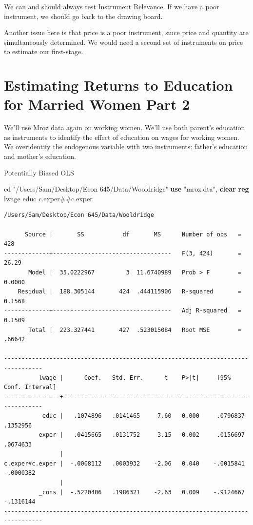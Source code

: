 \documentclass[
]{book}
\newenvironment{Shaded}{\begin{snugshade}}{\end{snugshade}}
\newcommand{\KeywordTok}[1]{\textcolor[rgb]{0.13,0.29,0.53}{\textbf{#1}}}
\newcommand{\NormalTok}[1]{#1}
\newcommand{\StringTok}[1]{\textcolor[rgb]{0.31,0.60,0.02}{#1}}
\begin{document}
We can and should always test Instrument Relevance. If we have a poor instrument, we should go back to the drawing board.

Another issue here is that price is a poor instrument, since price and quantity are simultaneously determined. We would need a second set of instruments on price to estimate our first-stage.

\section{Estimating Returns to Education for Married Women Part 2}\label{estimating-returns-to-education-for-married-women-part-2}

We'll use Mroz data again on working women. We'll use both parent's education as instruments to identify the effect of education on wages for working women. We overidentify the endogenous variable with two instruments: father's education and mother's education.

Potentially Biased OLS

\begin{Shaded}
\begin{Highlighting}[]
\NormalTok{cd }\StringTok{"/Users/Sam/Desktop/Econ 645/Data/Wooldridge"}
\KeywordTok{use} \StringTok{"mroz.dta"}\NormalTok{, }\KeywordTok{clear}
\KeywordTok{reg}\NormalTok{ lwage educ c.exper\#\#c.exper}
\end{Highlighting}
\end{Shaded}

\begin{verbatim}
/Users/Sam/Desktop/Econ 645/Data/Wooldridge

      Source |       SS           df       MS      Number of obs   =       428
-------------+----------------------------------   F(3, 424)       =     26.29
       Model |  35.0222967         3  11.6740989   Prob > F        =    0.0000
    Residual |  188.305144       424  .444115906   R-squared       =    0.1568
-------------+----------------------------------   Adj R-squared   =    0.1509
       Total |  223.327441       427  .523015084   Root MSE        =    .66642

---------------------------------------------------------------------------------
          lwage |      Coef.   Std. Err.      t    P>|t|     [95% Conf. Interval]
----------------+----------------------------------------------------------------
           educ |   .1074896   .0141465     7.60   0.000     .0796837    .1352956
          exper |   .0415665   .0131752     3.15   0.002     .0156697    .0674633
                |
c.exper#c.exper |  -.0008112   .0003932    -2.06   0.040    -.0015841   -.0000382
                |
          _cons |  -.5220406   .1986321    -2.63   0.009    -.9124667   -.1316144
---------------------------------------------------------------------------------
\end{verbatim}
\end{document}
